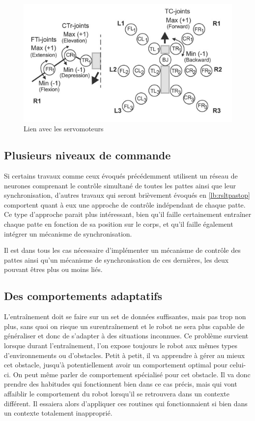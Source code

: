 \documentclass{tnreport}
\begin{document}
\begin{figure}[h]
    \centering
    \includegraphics[width = 15cm]{figures/mannoonarchi2}
    \caption{Lien avec les servomoteurs\cite{manoonpong_sensor-driven_2008}}
    \label{fig:manoonarchi2}
\end{figure}

\subsection{Plusieurs niveaux de commande}

Si certains travaux comme ceux évoqués précédemment\cite{manoonpong_sensor-driven_2008} utilisent un réseau de neurones comprenant le contrôle simultané de toutes les pattes ainsi que leur synchronisation, d'autres travaux qui seront brièvement évoqués en \ref{lb:rsltpastop} comportent quant à eux une approche de contrôle indépendant de chaque patte. Ce type d'approche parait plus intéressant, bien qu'il faille certainement entraîner chaque patte en fonction de sa position sur le corps, et qu'il faille également intégrer un mécanisme de synchronisation. 

Il est dans tous les cas nécessaire d'implémenter un mécanisme de contrôle des pattes ainsi qu'un mécanisme de synchronisation de ces dernières, les deux pouvant êtres plus ou moins liés.

\subsection{Des comportements adaptatifs}

L'entraînement doit se faire sur un set de données suffisantes, mais pas trop non plus, sans quoi on risque un surentraînement et le robot ne sera plus capable de généraliser et donc de s'adapter à des situations inconnues. Ce problème survient lorsque durant l'entraînement, l'on expose toujours le robot aux mêmes types d'environnements ou d'obstacles. Petit à petit, il va apprendre à gérer au mieux cet obstacle, jusqu'à potentiellement avoir un comportement optimal pour celui-ci. On peut même parler de comportement spécialisé pour cet obstacle. Il va donc prendre des habitudes qui fonctionnent bien dans ce cas précis, mais qui vont affaiblir le comportement du robot lorsqu'il se retrouvera dans un contexte différent. Il essaiera alors d'appliquer ces routines qui fonctionnaient si bien dans un contexte totalement inapproprié. 
\clearpage
\end{document}
